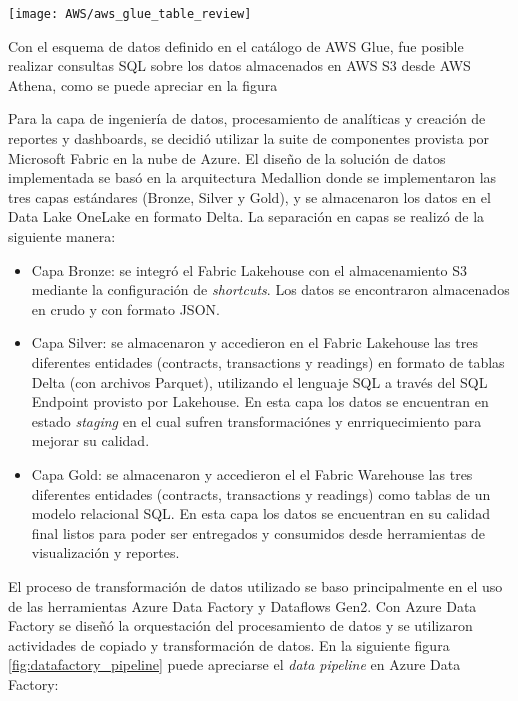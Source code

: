 \begin{center}
   \texttt{[image: AWS/aws\_glue\_table\_review]}
   \label{fig:aws_glue_table_review}
\end{center}

Con el esquema de datos definido en el catálogo de AWS Glue, fue posible realizar consultas SQL sobre los datos almacenados en AWS S3 desde AWS Athena, como se puede apreciar en la figura 

Para la capa de ingeniería de datos, procesamiento de analíticas y creación de reportes y dashboards, se decidió utilizar la suite de componentes provista por Microsoft Fabric en la nube de Azure.
El diseño de la solución de datos implementada se basó en la arquitectura Medallion donde se implementaron las tres capas estándares (Bronze, Silver y Gold), y se almacenaron los datos en el Data Lake OneLake en formato Delta. La separación en capas se realizó de la siguiente manera:

\begin{itemize}
	\item Capa Bronze: se integró el Fabric Lakehouse con el almacenamiento S3 mediante la configuración de \textit{shortcuts}. Los datos se encontraron almacenados en crudo y con formato JSON.
	\item Capa Silver: se almacenaron y accedieron en el Fabric Lakehouse las tres diferentes entidades (contracts, transactions y readings) en formato de tablas Delta (con archivos Parquet), utilizando el lenguaje SQL a través del SQL Endpoint provisto por Lakehouse. En esta capa los datos se encuentran en estado \textit{staging} en el cual sufren transformaciónes y enrriquecimiento para mejorar su calidad.
	\item Capa Gold: se almacenaron y accedieron el el Fabric Warehouse las tres diferentes entidades (contracts, transactions y readings) como tablas de un modelo relacional SQL. En esta capa los datos se encuentran en su calidad final listos para poder ser entregados y consumidos desde herramientas de visualización y reportes.
\end{itemize}

El proceso de transformación de datos utilizado se baso principalmente en el uso de las herramientas Azure Data Factory y Dataflows Gen2. Con Azure Data Factory se diseñó la orquestación del procesamiento de datos y se utilizaron actividades de copiado y transformación de datos. En la siguiente figura \ref{fig:datafactory_pipeline} puede apreciarse el \textit{data pipeline} en Azure Data Factory:

